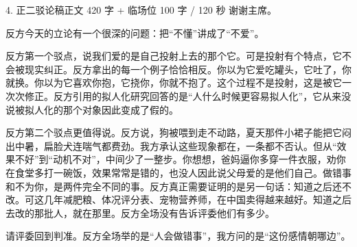 \documentclass[script,pro]{debate}
\begin{document}
\begin{speech}{4. 正二驳论稿}{正文 420 字 + 临场位 100 字 / 120 秒}
谢谢主席。

反方今天的立论有一个很深的问题：把“不懂”讲成了“不爱”。

反方第一个驳点，说我们爱的是自己投射上去的那个它。可是投射有个特点，它不会被现实纠正。反方拿出的每一个例子恰恰相反。你以为它爱吃罐头，它吐了，你就换。你以为它喜欢你抱，它挠你，你就不抱了。这个过程不是投射，这是被它一次次修正。反方引用的拟人化研究回答的是“人什么时候更容易拟人化”，它从来没说被拟人化的那个对象因此变成了假的。

反方第二个驳点更值得说。反方说，狗被喂到走不动路，夏天那件小裙子能把它闷出中暑，扁脸犬连喘气都费劲。我方承认这些现象都在，一条都不否认。但从“效果不好”到“动机不对”，中间少了一整步。你想想，爸妈逼你多穿一件衣服，劝你在食堂多打一碗饭，效果常常是错的，也没人因此说父母爱的是他们自己。做错事和不为你，是两件完全不同的事。反方真正需要证明的是另一句话：知道之后还不改。可这几年减肥粮、体况评分表、宠物营养师，在中国卖得越来越好。知道之后去改的那批人，就在那里。反方全场没有告诉评委他们有多少。

请评委回到判准。反方全场举的是“人会做错事”，我方问的是“这份感情朝哪边”。

\begin{contingency}
\end{contingency}
\end{speech}
\end{document}
